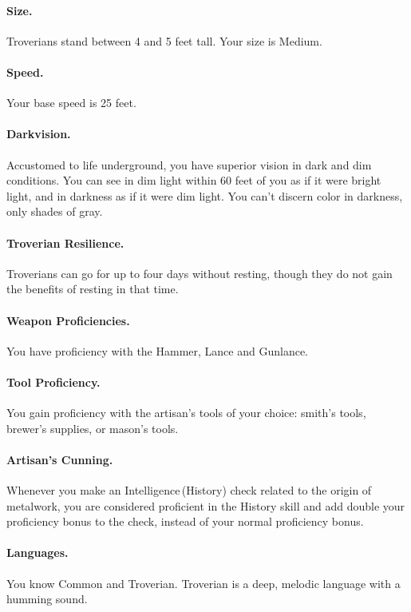 \paragraph{Size.} Troverians stand between 4 and 5 feet tall. Your size is Medium.

\paragraph{Speed.} Your base speed is 25 feet.

\paragraph{Darkvision.} Accustomed to life underground, you have superior vision in dark and dim conditions. You can see in dim light within 60 feet of you as if it were bright light, and in darkness as if it were dim light. You can't discern color in darkness, only shades of gray.

\paragraph{Troverian Resilience.} Troverians can go for up to four days without resting, though they do not gain the benefits of resting in that time.

\paragraph{Weapon Proficiencies.} You have proficiency with the Hammer, Lance and Gunlance.

\paragraph{Tool Proficiency.} You gain proficiency with the artisan's tools of your choice: smith's tools, brewer's supplies, or mason's tools.

\paragraph{Artisan's Cunning.} Whenever you make an Intelligence\,(History) check related to the origin of metalwork, you are considered proficient in the History skill and add double your proficiency bonus to the check, instead of your normal proficiency bonus.

\paragraph{Languages.} You know Common and Troverian. Troverian is a deep, melodic language with a humming sound.

